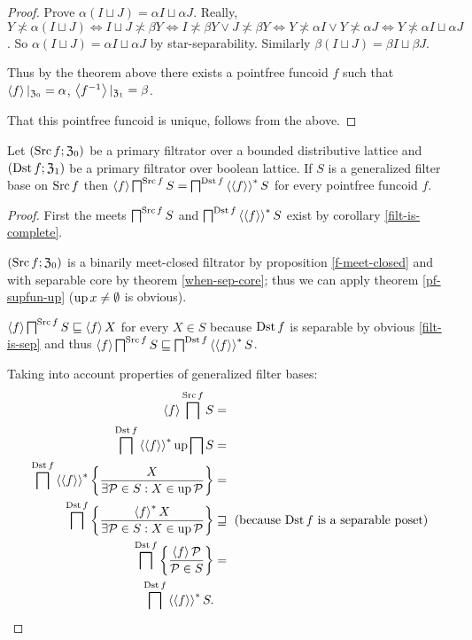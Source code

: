 \begin{proof}
Prove $\alpha(I\sqcup J)=\alpha I\sqcup\alpha J$. Really, $Y\nasymp\alpha(I\sqcup J)\Leftrightarrow I\sqcup J\nasymp\beta Y\Leftrightarrow I\nasymp\beta Y\vee J\nasymp\beta Y\Leftrightarrow Y\nasymp\alpha I\vee Y\nasymp\alpha J\Leftrightarrow Y\nasymp\alpha I\sqcup\alpha J$.
So $\alpha(I\sqcup J)=\alpha I\sqcup\alpha J$ by star-separability.
Similarly $\beta(I\sqcup J)=\beta I\sqcup\beta J$.

Thus by the theorem above there exists a pointfree funcoid $f$ such that
$\left\langle f\right\rangle|_{\mathfrak{Z}_0}=\alpha$, $\left\langle f^{-1}\right\rangle|_{\mathfrak{Z}_1}=\beta$.

That this pointfree funcoid is unique, follows from the above.\end{proof}
\begin{prop}
Let $(\operatorname{Src} f;\mathfrak{Z}_{0})$ be a primary filtrator over a bounded
distributive lattice and $(\operatorname{Dst} f;\mathfrak{Z}_{1})$ be a primary
filtrator over boolean lattice. If $S$ is a generalized filter base
on $\operatorname{Src} f$ then $\left\langle f\right\rangle\bigsqcap^{\operatorname{Src} f}S=\bigsqcap^{\operatorname{Dst} f}\left\langle \left\langle f\right\rangle\right\rangle ^{\ast}S$
for every pointfree funcoid $f$.\end{prop}
\begin{proof}
First the meets $\bigsqcap^{\operatorname{Src} f}S$ and $\bigsqcap^{\operatorname{Dst} f}\left\langle \left\langle f\right\rangle\right\rangle ^{\ast}S$
exist by corollary \ref{filt-is-complete}.

$(\operatorname{Src} f;\mathfrak{Z}_{0})$ is a binarily meet-closed filtrator by
proposition \ref{f-meet-closed} and with separable core by theorem
\ref{when-sep-core}; thus we can apply theorem \ref{pf-supfun-up}
($\operatorname{up} x\neq\emptyset$ is obvious).

$\left\langle f\right\rangle\bigsqcap^{\operatorname{Src} f}S\sqsubseteq\left\langle f\right\rangle X$ for every $X\in S$
because $\operatorname{Dst} f$ is separable by obvious \ref{filt-is-sep} and thus
$\left\langle f\right\rangle\bigsqcap^{\operatorname{Src} f}S\sqsubseteq\bigsqcap^{\operatorname{Dst} f}\left\langle \left\langle f\right\rangle\right\rangle ^{\ast}S$.

Taking into account properties of generalized filter bases:
\begin{align*}
\left\langle f\right\rangle\bigsqcap^{\operatorname{Src} f}S & =\\
\bigsqcap^{\operatorname{Dst} f}\left\langle \left\langle f\right\rangle\right\rangle ^{\ast}\operatorname{up}\bigsqcap S & =\\
\bigsqcap^{\operatorname{Dst} f}\left\langle \left\langle f\right\rangle\right\rangle ^{\ast}\left\{ \frac{X}{\exists\mathcal{P}\in S:X\in\operatorname{up}\mathcal{P}}\right\} & =\\
\bigsqcap^{\operatorname{Dst} f}\left\{ \frac{\left\langle f\right\rangle ^{\ast}X}{\exists\mathcal{P}\in S:X\in\operatorname{up}\mathcal{P}}\right\} & \sqsupseteq\text{ (because \ensuremath{\operatorname{Dst} f} is a separable poset)}\\
\bigsqcap^{\operatorname{Dst} f}\left\{ \frac{\left\langle f\right\rangle\mathcal{P}}{\mathcal{P}\in S}\right\} & =\\
\bigsqcap^{\operatorname{Dst} f}\left\langle \left\langle f\right\rangle\right\rangle ^{\ast}S.
\end{align*}
\end{proof}
